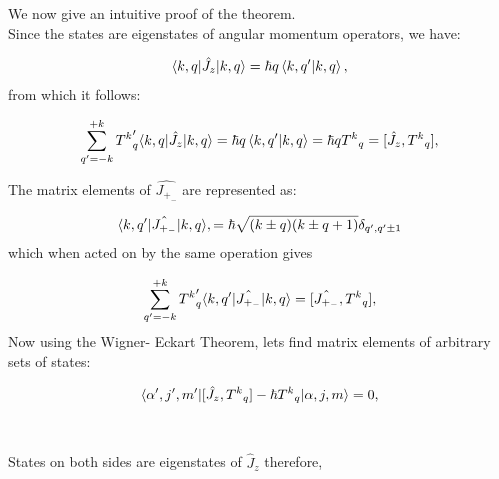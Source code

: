 \documentclass[a4paper,11pt]{article}
\DeclarePairedDelimiter\bra{\langle}{\rvert}
\DeclarePairedDelimiter\ket{\lvert}{\rangle}
\begin{document}
We now give an intuitive proof of the theorem.
\\

Since the states are eigenstates of angular momentum operators, we have:

\begin{equation}
\label{eq: Application on states}
\begin{aligned}
\bra{k,q}  \hat{J}_z  \ket{k,q} = \hbar q \braket{k,q'}{k,q},
\end{aligned}
\end{equation}
from which it follows:

\begin{equation}
\label{eq:Jz action}
\begin{aligned}
\sum_{q'=-k} ^{+k} {T^k}_q' \bra{k,q}  \hat{J}_z  \ket{k,q} = \hbar q \braket{k,q'}{k,q} = \hbar q {T^k}_q = [\hat{J}_z,{T^k}_q ],
\end{aligned}
\end{equation}


The matrix elements of $\hat{J_{+_-}}$ are represented as:

\begin{equation}
\label{eq:Matrix Elements of J+-}
\begin{aligned}
\bra{k,q'} \hat{J_{+_-}} \ket{k,q}, = \hbar \sqrt{(k \pm q)(k \pm q +1)} \delta _{q',q' \pm 1}
\end{aligned}
\end{equation}
which when acted on by the same operation gives 

\begin{equation}
\label{eq:Action of Operator}
\begin{aligned}
\sum_{q'=-k} ^{+k} {T^k}_q'  \bra{k,q'} \hat{J_{+_-}}\ket{k,q} = [\hat{J_{+_-}}, {T^k}_q ],
\end{aligned}
\end{equation}
Now using the Wigner- Eckart Theorem, lets find matrix elements of arbitrary sets of states:


\begin{equation}
\label{eq:Matrix elements of arbitrary sets of states}
\begin{aligned}
\bra{\alpha', j', m'} [\hat{J}_z,{T^k}_q ] -\hbar {T^k}_q \ket{\alpha, j, m} = 0,
\end{aligned}
\end{equation}
\\\\

States on both sides are eigenstates of $\hat{J}_z$ therefore, 
\end{document}
